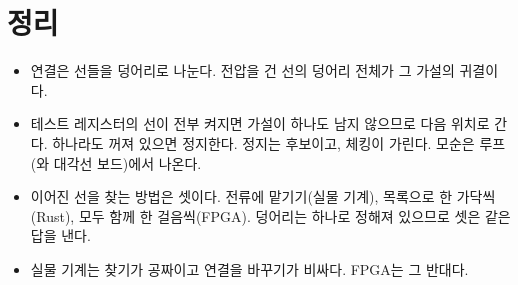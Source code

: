 \section{정리}

\begin{itemize}
\item 연결은 선들을 덩어리로 나눈다. 전압을 건 선의 덩어리 전체가 그 가설의 귀결이다.
\item 테스트 레지스터의 선이 전부 켜지면 가설이 하나도 남지 않으므로 다음 위치로 간다. 하나라도 꺼져 있으면 정지한다.
정지는 후보이고, 체킹이 가린다. 모순은 루프(와 대각선 보드)에서 나온다.
\item 이어진 선을 찾는 방법은 셋이다. 전류에 맡기기(실물 기계), 목록으로 한 가닥씩(Rust), 모두 함께 한 걸음씩(FPGA).
덩어리는 하나로 정해져 있으므로 셋은 같은 답을 낸다.
\item 실물 기계는 찾기가 공짜이고 연결을 바꾸기가 비싸다. FPGA는 그 반대다.
\end{itemize}
